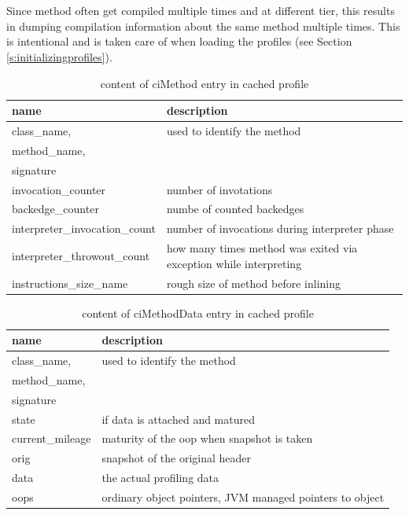 \\\\
Since method often get compiled multiple times and at different tier, this results in dumping compilation information about the same method multiple times. This is intentional and is taken care of when loading the profiles (see Section \ref{s:initializingprofiles}).
\begin{table}[ht!]
  \caption{content of ciMethod entry in cached profile}
  \label{t:cimethod}
  \begin{center}
    \begin{tabular}{|p{5cm}|p{10.5cm}|} 
      \hline
       \textbf{name} & \textbf{description} \\ \hline\hline
       class\_name,& used to identify the method\\
       method\_name, & \\
       signature & \\ \hline
       invocation\_counter & number of invotations\\ \hline
       backedge\_counter & numbe of counted backedges\\ \hline
       interpreter\_invocation\_count & number of invocations during interpreter phase\\ \hline
       interpreter\_throwout\_count & how many times method was exited via exception while interpreting\\ \hline
       instructions\_size\_name & rough size of method before inlining\\ \hline
    \end{tabular}
  \end{center}
\end{table}
\begin{table}[ht!]
  \caption{content of ciMethodData entry in cached profile}
  \label{t:cimethoddata}
  \begin{center}
    \begin{tabular}{|p{5cm}|p{10.5cm}|} 
      \hline
       \textbf{name} & \textbf{description} \\ \hline\hline
       class\_name,& used to identify the method\\
       method\_name, & \\
       signature & \\ \hline
       state & if data is attached and matured\\ \hline
       current\_mileage & maturity of the oop when snapshot is taken\\ \hline
       orig &  snapshot of the original header\\ \hline
       data & the actual profiling data\\ \hline
       oops & ordinary object pointers, JVM managed pointers to object\\ \hline        
    \end{tabular}
  \end{center}
\end{table}
